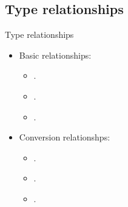 \subsection{Type relationships}

\begin{frame}[t,fragile]{Type relationships}
\begin{itemize}
  \item Basic relationships:
    \begin{itemize}
      \item {}.
      \item {}.
      \item {}.
    \end{itemize}

  \item Conversion relationshps:
    \begin{itemize}
      \item {}.
      \item {}.
      \item {}.
    \end{itemize}
\end{itemize}
\end{frame}
